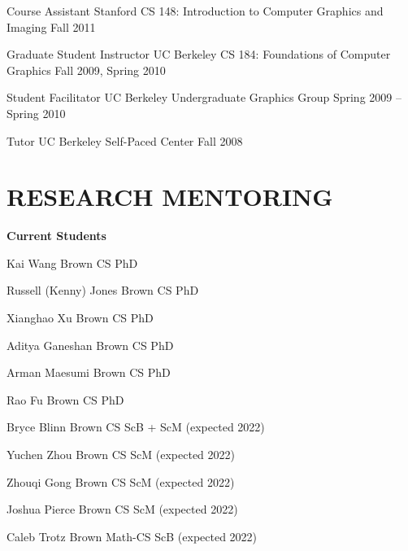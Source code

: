 \documentclass[line,margin]{res}
\begin{document}
\begin{resume}
\teach
{Course Assistant}
{Stanford CS 148: Introduction to Computer Graphics and Imaging}
{Fall 2011}

\teach
{Graduate Student Instructor}
{UC Berkeley CS 184: Foundations of Computer Graphics}
{Fall 2009, Spring 2010}

\teach
{Student Facilitator}
{UC Berkeley Undergraduate Graphics Group}
{Spring 2009 -- Spring 2010}

\teach
{Tutor}
{UC Berkeley Self-Paced Center}
{Fall 2008}


\section{RESEARCH MENTORING}

\newcommand{\currentphd}[2] {
	#1 \hfill #2
}

\newcommand{\student}[3] {
	#1 \hfill #2 (expected #3)
}

\newcommand{\alumni}[4] {
	#1 \hfill #2 #3\\
	\emph{Next position: #4}
}

\newcommand{\visitor}[4] {
	#1 \hfill #2 #3\\
	\emph{Home institution: #4}
}

\newcommand{\thesiscomm}[3] {
	#1 \hfill #2\\
	\emph{#3}
}


\textbf{Current Students}

\currentphd
{Kai Wang}
{Brown CS PhD}

\currentphd
{Russell (Kenny) Jones}
{Brown CS PhD}

\currentphd
{Xianghao Xu}
{Brown CS PhD}

\currentphd
{Aditya Ganeshan}
{Brown CS PhD}

\currentphd
{Arman Maesumi}
{Brown CS PhD}

\currentphd
{Rao Fu}
{Brown CS PhD}

\student
{Bryce Blinn}
{Brown CS ScB + ScM}
{2022}	

\student
{Yuchen Zhou}
{Brown CS ScM}
{2022}

\student
{Zhouqi Gong}
{Brown CS ScM}
{2022}

\student
{Joshua Pierce}
{Brown CS ScM}
{2022}

\student
{Caleb Trotz}
{Brown Math-CS ScB}
{2022}


\end{resume}
\end{document}
